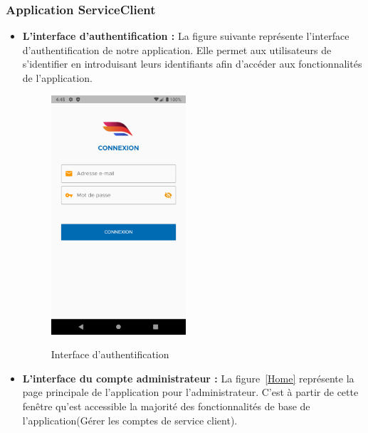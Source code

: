 \subsubsection{Application ServiceClient}
\begin{itemize}[label=$\ast$]
		\item \textbf{L’interface
		d’authentification
		:} La figure suivante représente l’interface d’authentification de notre application. Elle permet aux utilisateurs de s’identifier en introduisant leurs identifiants afin d’accéder aux fonctionnalités de l’application.
	
	\begin{figure}%
		\centering
		{{\includegraphics[width=5cm]{./Template LaTeX/Images/From_emu/login.png} }}%
		\caption{Interface d'authentification}%
		\label{fig:example}%
	\end{figure}
\newpage
	\item \textbf{L’interface du compte administrateur
	:} La figure~\ref{Home} représente la page principale de l’application pour l'administrateur. C’est à partir de cette fenêtre qu’est accessible la majorité des fonctionnalités de base de l’application(Gérer les comptes de service client).

\end{itemize}
